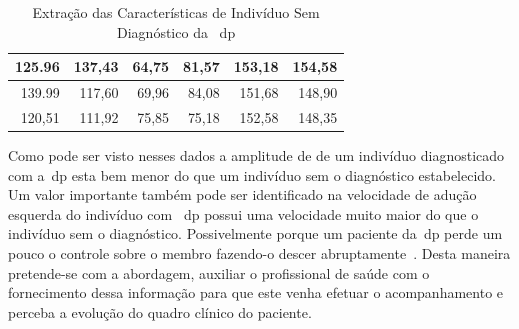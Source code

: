 \begin{table}[h]
\begin{tabular}{|r|r|r|r|r|r|}
125.96                                                                                   & 137,43                                                                                   & 64,75                                                              & 81,57                                                             & 153,18            & 154,58             \\ \hline
139.99                                                                                   & 117,60                                                                                   & 69,96                                                              & 84,08                                                             & 151,68            & 148,90             \\ \hline
120,51                                                                                   & 111,92                                                                                   & 75,85                                                              & 75,18                                                             & 152,58            & 148,35             \\ \hline
\end{tabular}
\caption{Extração das Características de Indivíduo Sem Diagnóstico da ~\ac{dp}}
\label{table:extracao_caracterisca_saudavel}
\end{table}

Como pode ser visto nesses dados a amplitude de de um indivíduo diagnosticado com a~\ac{dp} esta bem menor do que um indivíduo sem o diagnóstico estabelecido. Um valor importante também pode ser identificado na velocidade de adução esquerda do indivíduo com ~\ac{dp} possui uma velocidade muito maior do que o indivíduo sem o diagnóstico. Possivelmente porque um paciente da~\ac{dp} perde um pouco o controle sobre o membro fazendo-o descer abruptamente~\cite{protpar010}. Desta maneira pretende-se com a abordagem, auxiliar o profissional de saúde com o fornecimento dessa informação para que este venha efetuar o acompanhamento e perceba a evolução do quadro clínico do paciente.


%

